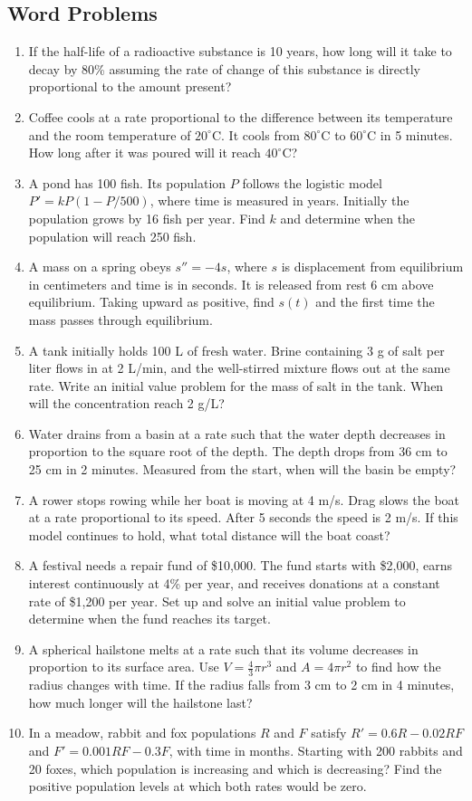 \documentclass{article}
\begin{document}
\newpage
\subsection{Word Problems}
\begin{enumerate}
\item If the half-life of a radioactive substance is 10 years, how long will it take to decay by 80\% assuming the rate of change of this substance is directly proportional to the amount present?
\item Coffee cools at a rate proportional to the difference between its temperature and the room temperature of $20^\circ$C. It cools from $80^\circ$C to $60^\circ$C in 5 minutes. How long after it was poured will it reach $40^\circ$C?
\item A pond has 100 fish. Its population $P$ follows the logistic model $P'=kP(1-P/500)$, where time is measured in years. Initially the population grows by 16 fish per year. Find $k$ and determine when the population will reach 250 fish.
\item A mass on a spring obeys $s''=-4s$, where $s$ is displacement from equilibrium in centimeters and time is in seconds. It is released from rest 6 cm above equilibrium. Taking upward as positive, find $s(t)$ and the first time the mass passes through equilibrium.
\item A tank initially holds 100 L of fresh water. Brine containing 3 g of salt per liter flows in at 2 L/min, and the well-stirred mixture flows out at the same rate. Write an initial value problem for the mass of salt in the tank. When will the concentration reach 2 g/L?
\item Water drains from a basin at a rate such that the water depth decreases in proportion to the square root of the depth. The depth drops from 36 cm to 25 cm in 2 minutes. Measured from the start, when will the basin be empty?
\item A rower stops rowing while her boat is moving at 4 m/s. Drag slows the boat at a rate proportional to its speed. After 5 seconds the speed is 2 m/s. If this model continues to hold, what total distance will the boat coast?
\item A festival needs a repair fund of \$10,000. The fund starts with \$2,000, earns interest continuously at 4\% per year, and receives donations at a constant rate of \$1,200 per year. Set up and solve an initial value problem to determine when the fund reaches its target.
\item A spherical hailstone melts at a rate such that its volume decreases in proportion to its surface area. Use $V=\tfrac43\pi r^3$ and $A=4\pi r^2$ to find how the radius changes with time. If the radius falls from 3 cm to 2 cm in 4 minutes, how much longer will the hailstone last?
\item In a meadow, rabbit and fox populations $R$ and $F$ satisfy $R'=0.6R-0.02RF$ and $F'=0.001RF-0.3F$, with time in months. Starting with 200 rabbits and 20 foxes, which population is increasing and which is decreasing? Find the positive population levels at which both rates would be zero.
\end{enumerate}
\end{document}

